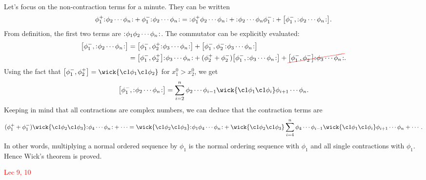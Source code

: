 \documentclass{article}
\begin{document}
Let's focus on the non-contraction terms for a minute. They can be written 
$$\phi^+_1\normord{\phi_2\cdots\phi_n}+\phi^-_1\normord{\phi_2\cdots\phi_n}=\normord{\phi^+_1\phi_2\cdots\phi_n}+\normord{\phi_2\cdots\phi_n\phi^-_1}+\comm{\phi^-_1}{\normord{\phi_2\cdots\phi_n}}.$$
From definition, the first two terms are ${:}\mkern1mu\phi_1\phi_2\cdots\phi_n\mkern1.6mu{:}$. The commutator can be explicitly evaluated:
\begin{align*}
    \comm{\phi^-_1}{\normord{\phi_2\cdots\phi_n}}&=\comm{\phi^-_1}{\phi^+_2\normord{\phi_3\cdots\phi_n}}+\comm{\phi^-_1}{\phi^-_2\normord{\phi_3\cdots\phi_n}}\\
    &=\comm{\phi^-_1}{\phi^+_2}\normord{\phi_3\cdots\phi_n}+(\phi^+_2+\phi^-_2)\comm{\phi^-_1}{\normord{\phi_3\cdots\phi_n}}+\Ccancel[red]{\comm{\phi^-_1}{\phi^-_2}\normord{\phi_3\cdots\phi_n}}.
\end{align*}
Using the fact that $\comm{\phi^-_1}{\phi^+_2}=\wick{\c1\phi_1\c1\phi_2}$ for $x^0_1>x^0_2$, we get 
$$\comm{\phi^-_1}{\normord{\phi_2\cdots\phi_n}}=\sum^n_{i=2}\phi_2\cdots\phi_{i-1}\wick{\c1\phi_1\c1\phi_i}\phi_{i+1}\cdots\phi_n.$$
Keeping in mind that all contractions are complex numbers, we can deduce that the contraction terms are 
$$(\phi^+_1+\phi^-_1)\wick{\c1\phi_2\c1\phi_3}\normord{\phi_4\cdots\phi_n}+\cdots=\wick{\c1\phi_2\c1\phi_3}\normord{\phi_1\phi_4\cdots\phi_n}+\wick{\c1\phi_2\c1\phi_3}\sum^n_{i=4}\phi_4\cdots\phi_{i-1}\wick{\c1\phi_1\c1\phi_i}\phi_{i+1}\cdots\phi_n+\cdots.$$
In other words, multiplying a normal ordered sequence by $\phi_1$ is the normal ordering sequence with $\phi_1$ and all single contractions with $\phi_1$. Hence Wick's theorem is proved.


\textcolor{red}{Lec 9, 10}
\end{document}
